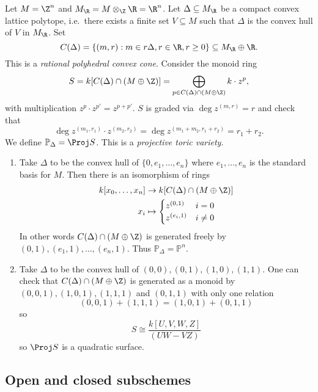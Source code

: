 \documentclass[a4paper]{article}
\renewcommand*{\P}{\mathbb{P}}
\begin{document}
\begin{eg}
  Let \(M = \Z^n\) and \(M_\R = M \otimes_\Z \R = \R^n\). Let \(\Delta \subseteq M_\R\) be a compact convex lattice polytope, i.e.\ there exists a finite set \(V \subseteq M\) such that \(\Delta\) is the convex hull of \(V\) in \(M_\R\). Set
  \[
    C(\Delta) = \{(m, r): m \in r \Delta, r \in \R, r \geq 0\} \subseteq M_\R \oplus \R.
  \]
  This is a \emph{rational polyhedral convex cone}. Consider the monoid ring
  \[
    S = k[C(\Delta) \cap (M \oplus \Z)] = \bigoplus_{p \in C(\Delta) \cap (M \oplus \Z)} k \cdot z^p,
  \]
  with multiplication \(z^p \cdot z^{p'} = z^{p + p'}\). \(S\) is graded via \(\deg z^{(m, r)} = r\) and check that
  \[
    \deg z^{(m_1, r_1)} \cdot z^{(m_2, r_2)} = \deg z^{(m_1 + m_2, r_1 + r_2)} = r_1 + r_2.
  \]
  We define \(\P_\Delta = \Proj S\). This is a \emph{projective toric variety}.
\end{eg}

\begin{eg}\leavevmode
  \begin{enumerate}
  \item Take \(\Delta\) to be the convex hull of \(\{0, e_1, \dots, e_n\}\) where \(e_1, \dots, e_n\) is the standard basis for \(M\). Then there is an isomorphism of rings
    \begin{align*}
      k[x_0, \dots, x_n] &\to k[C(\Delta) \cap (M \oplus \Z)] \\
      x_i &\mapsto
            \begin{cases}
              z^{(0, 1)} & i = 0 \\
              z^{(e_i, 1)} & i \ne 0
            \end{cases}
    \end{align*}
    In other words \(C(\Delta) \cap (M \oplus \Z)\) is generated freely by \((0, 1), (e_1, 1), \dots, (e_n, 1)\). Thus \(\P_\Delta = \P^n\).
  \item Take \(\Delta\) to be the convex hull of \((0, 0), (0, 1), (1, 0), (1, 1)\). One can check that \(C(\Delta) \cap (M \oplus \Z)\) is generated as a monoid by \((0, 0, 1), (1, 0, 1), (1, 1, 1)\) and \((0, 1, 1)\) with only one relation
    \[
      (0, 0, 1) + (1, 1, 1) = (1, 0, 1) + (0, 1, 1)
    \]
    so
    \[
      S \cong \frac{k[U, V, W, Z]}{(UW - VZ)}
    \]
    so \(\Proj S\) is a quadratic surface.
  \end{enumerate}
\end{eg}

\subsection{Open and closed subschemes}
\end{document}
